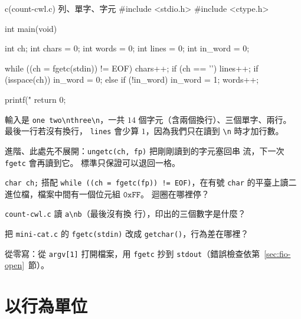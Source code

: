 \begin{example}[label=ex:fio-count]{c}{(count-cwl.c) 列、單字、字元}
#include <stdio.h>
#include <ctype.h>

int main(void) {
    int ch;
    int chars = 0;
    int words = 0;
    int lines = 0;
    int in_word = 0;

    while ((ch = fgetc(stdin)) != EOF) {
        chars++;
        if (ch == '\n') {
            lines++;
        }
        if (isspace(ch)) {
            in_word = 0;
        } else if (!in_word) {
            in_word = 1;
            words++;
        }
    }

    printf("%
    return 0;
}
\end{example}


輸入是 \texttt{one two\textbackslash nthree\textbackslash n}，一共
$14$ 個字元（含兩個換行）、三個單字、兩行。 最後一行若沒有換行，
\texttt{lines} 會少算 $1$，因為我們只在讀到 \texttt{\textbackslash n}
時才加行數。

進階、此處先不展開：\texttt{ungetc(ch, fp)} 把剛剛讀到的字元塞回串
流，下一次 \texttt{fgetc} 會再讀到它。 標準只保證可以退回一格。


\begin{drills}[label=drills:fio-char]
\item \texttt{char ch;} 搭配 \texttt{while ((ch = fgetc(fp)) !=
EOF)}，在有號 \texttt{char} 的平臺上讀二進位檔，檔案中間有一個位元組
$\mathtt{0xFF}$。 迴圈在哪裡停？
\item \texttt{count-cwl.c} 讀 \texttt{a\textbackslash nb}（最後沒有換
行），印出的三個數字是什麼？
\item 把 \texttt{mini-cat.c} 的 \texttt{fgetc(stdin)} 改成
\texttt{getchar()}，行為差在哪裡？
\item 從零寫：從 \texttt{argv[1]} 打開檔案，用 \texttt{fgetc} 抄到
\texttt{stdout}（錯誤檢查依第~\ref{sec:fio-open}~節）。
\end{drills}

\section{以行為單位}
\label{sec:fio-line}

